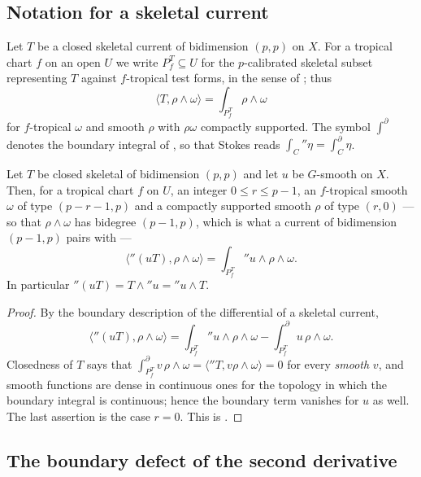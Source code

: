 \subsection{Notation for a skeletal current}
\label{sec:ch16-skeletal-notation}

Let $T$ be a closed skeletal current of bidimension $(p,p)$ on $X$.  For a
tropical chart $f$ on an open $U$ we write $P^T_f\subseteq U$ for the
$p$-calibrated skeletal subset representing $T$ against $f$-tropical test
forms, in the sense of ; thus
\[
 \langle T,\rho\wedge\omega\rangle=\int_{P^T_f}\rho\wedge\omega
\]
for $f$-tropical $\omega$ and smooth $\rho$ with $\rho\omega$ compactly
supported.  The symbol $\int^{\partial}$ denotes the boundary integral of
, so that Stokes reads
$\int_C\dprime\eta=\int^\partial_C\eta$.

\begin{proposition}
\label{prop:ch16-skeletal-first-derivative}
Let $T$ be closed skeletal of bidimension $(p,p)$ and let $u$ be $G$-smooth
on $X$.  Then, for a tropical chart $f$ on $U$, an integer $0\leq r\leq p-1$, an
$f$-tropical smooth $\omega$ of type $(p-r-1,p)$ and a compactly supported
smooth $\rho$ of type $(r,0)$ --- so that $\rho\wedge\omega$ has bidegree
$(p-1,p)$, which is what a current of bidimension $(p-1,p)$ pairs with ---
\[
 \bigl\langle\dprime(uT),\rho\wedge\omega\bigr\rangle
 =\int_{P^T_f}\dprime u\wedge\rho\wedge\omega .
\]
In particular $\dprime(uT)=T\wedge\dprime u=\dprime u\wedge T$.
\end{proposition}

\begin{proof}
By the boundary description of the differential of a skeletal current,
\[
 \bigl\langle\dprime(uT),\rho\wedge\omega\bigr\rangle
 =\int_{P^T_f}\dprime u\wedge\rho\wedge\omega
   -\int^{\partial}_{P^T_f}u\,\rho\wedge\omega .
\]
Closedness of $T$ says that
$\int^\partial_{P^T_f}v\,\rho\wedge\omega=\langle\dprime T,
 v\rho\wedge\omega\rangle=0$ for every \emph{smooth} $v$, and smooth
functions are dense in continuous ones for the topology in which the
boundary integral is continuous; hence the boundary term vanishes for $u$ as
well.  The last assertion is the case $r=0$.  This is
\cite[Proposition~8.10.1]{CLD25}.
\end{proof}

\subsection{The boundary defect of the second derivative}
\label{sec:ch16-skeletal-defect}

